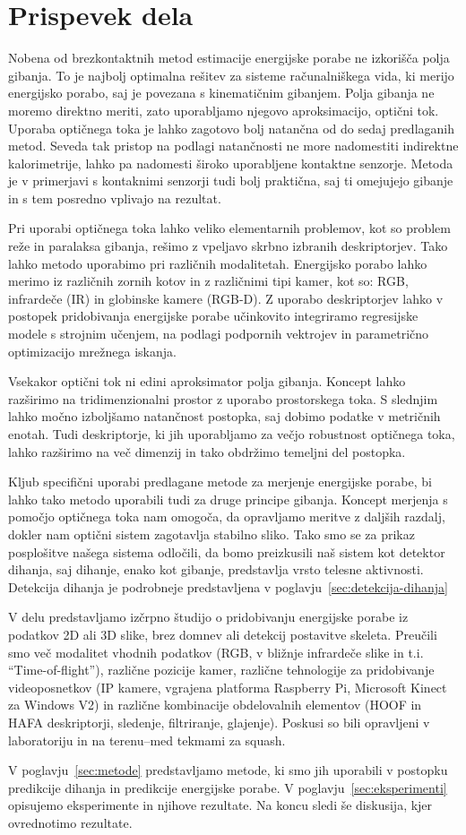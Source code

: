 \section{Prispevek dela}
Nobena od brezkontaktnih metod estimacije energijske porabe ne izkorišča polja gibanja. To je najbolj optimalna rešitev za sisteme računalniškega vida, ki merijo energijsko porabo, saj je povezana s kinematičnim gibanjem. Polja gibanja ne moremo direktno meriti, zato uporabljamo njegovo aproksimacijo, optični tok. Uporaba optičnega toka je lahko zagotovo bolj natančna od do sedaj predlaganih metod. Seveda tak pristop na podlagi natančnosti ne more nadomestiti indirektne kalorimetrije, lahko pa nadomesti široko uporabljene kontaktne senzorje. Metoda je v primerjavi s kontaknimi senzorji tudi bolj praktična, saj ti omejujejo gibanje in s tem posredno vplivajo na rezultat. 

Pri uporabi optičnega toka lahko veliko elementarnih problemov, kot so problem reže in paralaksa gibanja, rešimo z vpeljavo skrbno izbranih deskriptorjev. Tako lahko metodo uporabimo pri različnih modalitetah. Energijsko porabo lahko merimo iz različnih zornih kotov in z različnimi tipi kamer, kot so: RGB, infrardeče (IR) in globinske kamere (RGB-D). Z uporabo deskriptorjev lahko v postopek pridobivanja energijske porabe učinkovito integriramo regresijske modele s strojnim učenjem, na podlagi podpornih vektrojev in parametrično optimizacijo mrežnega iskanja. 

Vsekakor optični tok ni edini aproksimator polja gibanja. Koncept lahko razširimo na tridimenzionalni prostor z uporabo prostorskega toka. S slednjim lahko močno izboljšamo natančnost postopka, saj dobimo podatke v metričnih enotah. Tudi deskriptorje, ki jih uporabljamo za večjo robustnost optičnega toka, lahko razširimo na več dimenzij in tako obdržimo temeljni del postopka.

Kljub specifični uporabi predlagane metode za merjenje energijske porabe, bi lahko tako metodo uporabili tudi za druge principe gibanja. Koncept merjenja s pomočjo optičnega toka nam omogoča, da opravljamo meritve z daljših razdalj, dokler nam optični sistem zagotavlja stabilno sliko. Tako smo se za prikaz posplošitve našega sistema odločili, da bomo preizkusili naš sistem kot detektor dihanja, saj dihanje, enako kot gibanje, predstavlja vrsto telesne aktivnosti. Detekcija dihanja je podrobneje predstavljena v poglavju~\ref{sec:detekcija-dihanja}

V delu predstavljamo izčrpno študijo o pridobivanju energijske porabe iz podatkov 2D ali 3D slike, brez domnev ali detekcij postavitve skeleta. Preučili smo več modalitet vhodnih podatkov (RGB, v bližnje infrardeče slike in t.i. ``Time-of-flight''), različne pozicije kamer, različne tehnologije za pridobivanje videoposnetkov (IP kamere, vgrajena platforma Raspberry Pi, Microsoft Kinect za Windows V2) in različne kombinacije obdelovalnih elementov (HOOF in HAFA deskriptorji, sledenje, filtriranje, glajenje). Poskusi so bili opravljeni v laboratoriju in na terenu--med tekmami za squash.

V poglavju~\ref{sec:metode}  predstavljamo metode, ki smo jih uporabili v postopku predikcije dihanja in predikcije energijske porabe. V poglavju~\ref{sec:eksperimenti} opisujemo eksperimente in njihove rezultate. Na koncu sledi še diskusija, kjer ovrednotimo rezultate. 